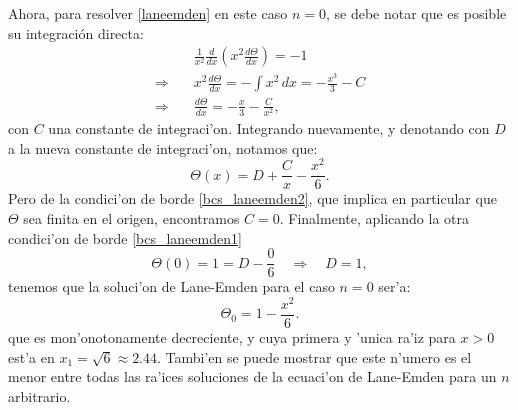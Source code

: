 Ahora, para resolver \eqref{laneemden} en este caso $n=0$, se debe notar que es posible su integraci\'on directa:
\begin{align}
 &\frac{1}{x^2}\frac{d}{dx}\left(x^2\frac{d\Theta}{dx}\right)=-1\\
\Rightarrow \quad &x^2\frac{d\Theta}{dx}=-\int x^2\,dx=-\frac{x^3}{3}-C\\
\Rightarrow\quad &\frac{d\Theta}{dx}=-\frac{x}{3}-\frac{C}{x^2},
\end{align}
con $C$ una constante de integraci'on. Integrando nuevamente, y denotando con $D$ a la nueva constante de integraci'on, notamos que:
\begin{equation}
 \Theta(x)=D+\frac{C}{x}-\frac{x^2}{6}.
\end{equation}
Pero de la condici'on de borde \eqref{bcs_laneemden2}, que implica en particular que $\Theta$ sea finita en el origen, encontramos $C=0$. Finalmente, aplicando la otra condici'on de borde \eqref{bcs_laneemden1}
\begin{equation}
 \Theta(0)=1=D-\frac{0}{6}\quad\Rightarrow\quad D=1,
\end{equation}
tenemos que la soluci'on de Lane-Emden para el caso $n=0$ ser'a:
\begin{equation}\label{lane0}
 \boxed{\Theta_0=1-\frac{x^2}{6}.}
\end{equation}
que es mon'onotonamente decreciente, y cuya primera y 'unica ra'iz para $x>0$ est'a en $x_1=\sqrt{6}\approx2.44$. Tambi'en se puede mostrar que este n'umero es el menor entre todas las ra'ices soluciones de la ecuaci'on de Lane-Emden para un $n$ arbitrario.

